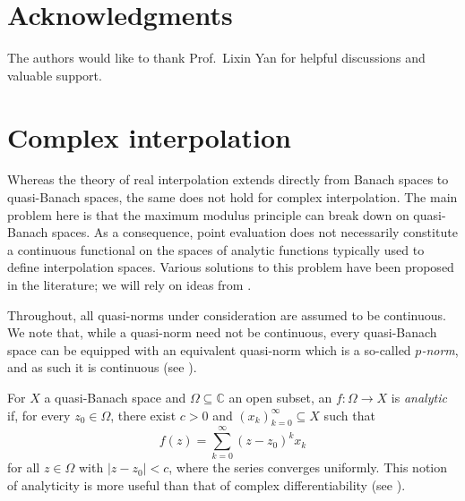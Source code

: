 \documentclass{amsart}
\newcommand {\C}{{\mathbb C}}
\theoremstyle{definition}
\numberwithin{equation}{section}
\begin{document}
\section*{Acknowledgments}\label{sec:acknowledge}

 The authors %
would like to thank Prof.~Lixin Yan for helpful  discussions and valuable support.




























\appendix

\section{Complex interpolation}\label{sec:inter}


Whereas the theory of real interpolation extends directly from Banach spaces to quasi-Banach spaces, the same does not hold for complex interpolation. The main problem here is that the maximum modulus principle can break down on quasi-Banach spaces. As a consequence, point evaluation does not necessarily constitute a continuous functional on the spaces of analytic functions typically used to define interpolation spaces. Various solutions to this problem have been proposed in the literature; we will rely on ideas from \cite{Kalton-Mitrea98}. %

Throughout, all quasi-norms under consideration are assumed to be continuous. {We note that, while a quasi-norm need not be continuous, every quasi-Banach space can be equipped with an equivalent quasi-norm which is a so-called \emph{$p$-norm}, and as such it is continuous (see \cite{Rolewicz84}).}

For $X$ a quasi-Banach space and $\Omega\subseteq \C$ an open subset, an $f:\Omega\to X$ is \emph{analytic} if, for every $z_{0}\in\Omega$, there exist $c>0$ and $(x_{k})_{k=0}^{\infty}\subseteq X$ such that
\[
f(z)=\sum_{k=0}^{\infty}(z-z_{0})^{k}x_{k}
\]
for all $z\in\Omega$ with $|z-z_{0}|<c$, where the series converges uniformly. This notion of analyticity is more useful than that of complex differentiability (see \cite{Kalton86a}).
\end{document}
